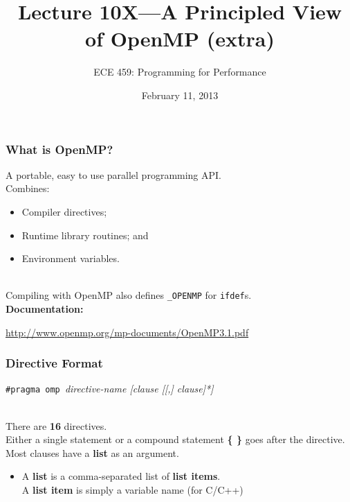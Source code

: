 \documentclass[aspectratio=43]{beamer}
\title{Lecture 10X---A Principled View of OpenMP (extra)}
\subtitle{ECE 459: Programming for Performance}
\date{February 11, 2013}
\newenvironment{changemargin}[1]{%
  \begin{list}{}{%
    \setlength{\topsep}{0pt}%
    \setlength{\leftmargin}{#1}%
    \setlength{\rightmargin}{1em}
    \setlength{\listparindent}{\parindent}%
    \setlength{\itemindent}{\parindent}%
    \setlength{\parsep}{\parskip}%
  }%
  \item[]}{\end{list}}
\begin{document}
\begin{frame}[plain]
  \titlepage
\end{frame}

\begin{frame}
  \frametitle{What is OpenMP?}

  \begin{changemargin}{1.5cm}
    A portable, easy to use parallel programming API.\\[1em]
    Combines:
      \begin{itemize}
        \item Compiler directives;
        \item Runtime library routines; and
        \item Environment variables.
      \end{itemize}
      ~\\

    Compiling with OpenMP also defines {\tt \_OPENMP} for {\tt ifdef}s.\\[1em]

  {\bf Documentation:}

  \url{http://www.openmp.org/mp-documents/OpenMP3.1.pdf}

  \end{changemargin}

\end{frame}

\begin{frame}
  \frametitle{Directive Format}

  \begin{changemargin}{2.5cm}

  \begin{center}
    {\tt \#pragma omp }{\it directive-name [clause [[,] clause]*]}
  \end{center}

    ~\\[1em]
    There are {\bf 16} directives.\\[1em]
    Either a single statement or a compound statement {\bf \{ \}} goes
      after the directive.\\[1em]

    Most clauses have a {\bf list} as an argument.
      \begin{itemize}
        \item A {\bf list} is a comma-separated list of {\bf list items}.\\
            A {\bf list item} is simply a variable name (for C/C++)
      \end{itemize}
  \end{changemargin}
\end{frame}
\end{document}
